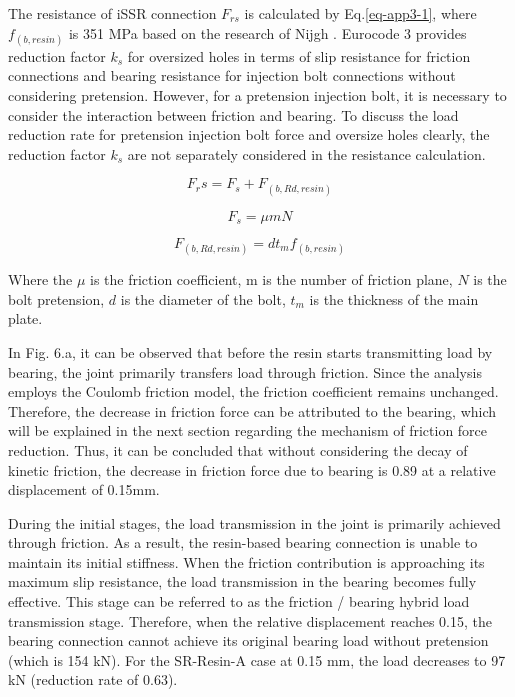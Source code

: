 The resistance of iSSR connection $F_{rs}$ is calculated by Eq.\ref{eq-app3-1}, where $f_{(b,resin)}$ is 351 MPa based on the research of Nijgh \cite{nijgh_new_2017}. Eurocode 3 provides reduction factor $k_s$ for oversized holes in terms of slip resistance for friction connections and bearing resistance for injection bolt connections without considering pretension. However, for a pretension injection bolt, it is necessary to consider the interaction between friction and bearing. To discuss the load reduction rate for pretension injection bolt force and oversize holes clearly, the reduction factor $k_s$ are not separately considered in the resistance calculation.

\begin{equation}\label{eq-app3-1}
    F_rs=F_s+F_{(b,Rd,resin)}
\end{equation}

\begin{equation}
    F_s=μmN
\end{equation}

\begin{equation}
 F_{(b,Rd,resin)}=dt_m f_{(b,resin)}
\end{equation}

Where the $μ$ is the friction coefficient, m is the number of friction plane,  $N$ is the bolt pretension, $d$ is the diameter of the bolt, $t_m$ is the thickness of the main plate.

In Fig. 6.a, it can be observed that before the resin starts transmitting load by bearing, the joint primarily transfers load through friction. Since the analysis employs the Coulomb friction model, the friction coefficient remains unchanged. Therefore, the decrease in friction force can be attributed to the bearing, which will be explained in the next section regarding the mechanism of friction force reduction. Thus, it can be concluded that without considering the decay of kinetic friction, the decrease in friction force due to bearing is 0.89 at a relative displacement of 0.15mm.

During the initial stages, the load transmission in the joint is primarily achieved through friction. As a result, the resin-based bearing connection is unable to maintain its initial stiffness. When the friction contribution is approaching its maximum slip resistance, the load transmission in the bearing becomes fully effective. This stage can be referred to as the friction / bearing hybrid load transmission stage. Therefore, when the relative displacement reaches 0.15, the bearing connection cannot achieve its original bearing load without pretension (which is 154 kN). For the SR-Resin-A case at 0.15 mm, the load decreases to 97 kN (reduction rate of 0.63).


